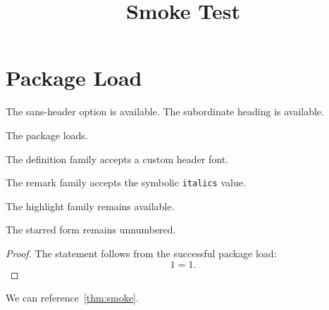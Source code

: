 \documentclass{article}
\title{Smoke Test}
\author{}
\date{}
\begin{document}
\maketitle
\section{Package Load}
 The sans-header option is available.
 The subordinate heading is available.
\begin{theorem}\label{thm:smoke}The package loads.\end{theorem}
\begin{definition}The definition family accepts a custom header font.\end{definition}
\begin{remark}The remark family accepts the symbolic \texttt{italics} value.\end{remark}
\begin{highlight}The highlight family remains available.\end{highlight}
\begin{theorem*}[Unnumbered]The starred form remains unnumbered.\end{theorem*}
\begin{proof}The statement follows from the successful package load:
\[
	1=1.
\]
\end{proof}
We can reference~\cref{thm:smoke}.
\end{document}
